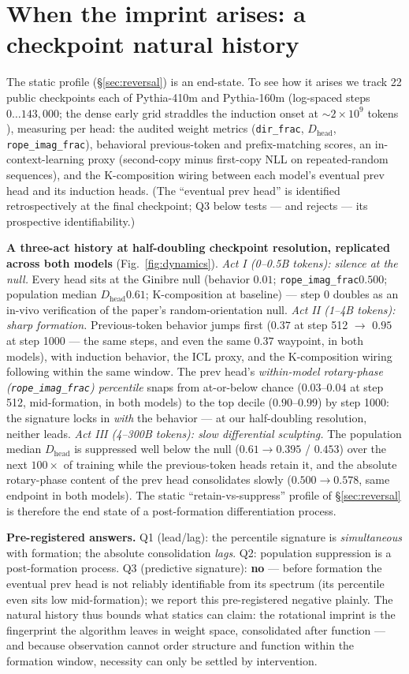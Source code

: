 \documentclass[11pt]{article}
\newcommand{\dirfrac}{\texttt{dir\_frac}\xspace}
\newcommand{\Dhead}{\ensuremath{D_{\text{head}}}\xspace}
\newcommand{\ropeimag}{\texttt{rope\_imag\_frac}\xspace}
\begin{document}
\section{When the imprint arises: a checkpoint natural history}\label{sec:dynamics}
The static profile (\S\ref{sec:reversal}) is an end-state. To see how it arises we track 22 public checkpoints each
of Pythia-410m and Pythia-160m (log-spaced steps $0\ldots143{,}000$; the dense early grid straddles the induction
onset at ${\sim}2{\times}10^9$ tokens \citep{tigges2024llm}), measuring per head: the audited weight metrics
(\dirfrac, \Dhead, \ropeimag), behavioral previous-token and prefix-matching scores, an in-context-learning proxy
(second-copy minus first-copy NLL on repeated-random sequences), and the K-composition wiring between each model's
eventual prev head and its induction heads. (The ``eventual prev head'' is identified retrospectively at the
final checkpoint; Q3 below tests --- and rejects --- its prospective identifiability.)

\textbf{A three-act history at half-doubling checkpoint resolution, replicated across both models}
(Fig.~\ref{fig:dynamics}).
\emph{Act I (0--0.5B tokens): silence at the null.} Every head sits at the Ginibre null (behavior $0.01$;
\ropeimag $0.500$; population median \Dhead $0.61$; K-composition at baseline) --- step 0 doubles as an in-vivo
verification of the paper's random-orientation null. \emph{Act II (1--4B tokens): sharp formation.} Previous-token
behavior jumps first ($0.37$ at step 512 $\to$ $0.95$ at step 1000 --- the same steps, and even the same $0.37$
waypoint, in both models), with induction behavior, the ICL proxy, and the K-composition wiring following within the
same window. The prev head's \emph{within-model rotary-phase (\ropeimag) percentile} snaps from at-or-below chance ($0.03$--$0.04$
at step 512, mid-formation, in both models) to the top decile ($0.90$--$0.99$) by step 1000: the signature locks in
\emph{with} the behavior --- at our half-doubling resolution, neither leads. \emph{Act III (4--300B tokens): slow
differential sculpting.} The population median \Dhead is suppressed well below the null ($0.61\to0.395$ / $0.453$)
over the next $100\times$ of training while the previous-token heads retain it, and the absolute rotary-phase content of
the prev head consolidates slowly ($0.500\to0.578$, same endpoint in both models). The static ``retain-vs-suppress''
profile of \S\ref{sec:reversal} is therefore the end state of a post-formation differentiation process.

\textbf{Pre-registered answers.} Q1 (lead/lag): the percentile signature is \emph{simultaneous} with formation; the
absolute consolidation \emph{lags}. Q2: population suppression is a post-formation process. Q3 (predictive
signature): \textbf{no} --- before formation the eventual prev head is not reliably identifiable from its spectrum
(its percentile even sits low mid-formation); we report this pre-registered negative plainly. The natural history
thus bounds what statics can claim: the rotational imprint is the fingerprint the algorithm leaves in weight space,
consolidated after function --- and because observation cannot order structure and function within the formation
window, necessity can only be settled by intervention.
\end{document}
